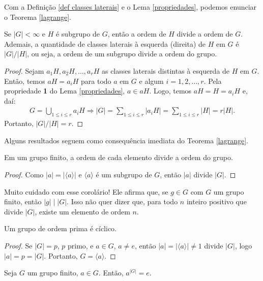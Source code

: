 	Com a Definição \ref{def classes laterais} e o 
	Lema \ref{propriedades}, podemos enunciar o Teorema \ref{lagrange}.
	\begin{theorem}
	\label{lagrange}
		Se $|G|<\infty$ e $H$ é subgrupo de $G$, então a ordem de $H$ divide 
		a ordem de $G$. Ademais, a quantidade de classes laterais à esquerda
		(direita) de $H$ em $G$ é $|G|/|H|$, ou seja, a ordem de um subgrupo
		divide a ordem do grupo. 
	\end{theorem}
	\begin{proof}
		Sejam $a_1H, a_2H, \dots , a_rH$ as classes laterais distintas à
		esquerda de $H$ em $G$. Então, temos $aH = a_iH$ para todo $a$ em 
		$G$ e algum $i = 1,2,\dots,r$. Pela propriedade \textbf{1} do 
		Lema \ref{propriedades}, $a\in aH$. Logo, temos $aH = H = a_iH$ 
		e, daí:
		\begin{align*}
		    G = \bigcup_{1\leq i\leq r}^{}a_iH \Rightarrow |G| 
		    = \sum_{1\leq i\leq r}^{}|a_iH| = \sum_{1\leq i\leq r}|H| 
		    = r|H|.
		\end{align*} 
		Portanto, $|G|/|H| = r$.
	\end{proof}
	Alguns resultados seguem como consequência imediata 
	do Teorema \ref{lagrange}.
	\begin{corollary}
	\label{c2}
		Em um grupo finito, a ordem de cada elemento divide a ordem do grupo.
	\end{corollary}
	\begin{proof}
		Como $|a| = |\langle a\rangle|$ e $\langle a \rangle$ é um subgrupo 
		de $G$, então $|a|$ divide $|G|$. 
	\end{proof}
    \begin{remark}
        Muito cuidado com esse corolário! Ele afirma que, se $g\in G$ com $G$
        um grupo finito, então $|g|\mid |G|$. Isso não quer dizer que, para todo
        $n$ inteiro positivo que divide $|G|$, existe um elemento de ordem $n$.
    \end{remark}
	\begin{corollary}
	\label{c3}
		Um grupo de ordem prima é cíclico.
	\end{corollary}
	\begin{proof}
		Se $|G| = p$, $p$ primo, e $a\in G$, $a\neq e$, então 
		$|a| = |\langle a\rangle | \neq 1$ divide $|G|$, logo 
		$|a| = p = |G|$. Portanto, $G = \langle a\rangle$. 
	\end{proof}
	\begin{corollary}
	\label{c4}
		Seja $G$ um grupo finito, $a\in G$. Então, $a^{|G|} = e.$
	\end{corollary}
	
